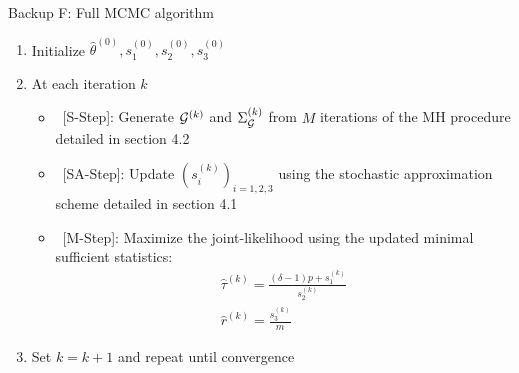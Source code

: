 \begin{frame}{Backup F: Full MCMC algorithm}
    \begin{algorithm}[H]
    \caption{MCMC Algorithm}
    \begin{enumerate}
        \item Initialize $\hat\theta^{(0)}, s_1^{(0)}, s_2^{(0)},s_3^{(0)}$
        \item At each iteration $k$
        \begin{itemize}
            \item \ [S-Step]: Generate $\mathcal{G}^{(k)}$ and $\Sigma_{\mathcal{G}}^{(k)}$ from $M$ iterations of the MH procedure detailed in section 4.2
            \item \ [SA-Step]: Update $(s_i^{(k)})_{i=1,2,3}$ using the stochastic approximation scheme detailed in section 4.1
            \item \ [M-Step]: Maximize the joint-likelihood using the updated minimal sufficient statistics:
            \begin{equation*}
                \begin{gathered}
                    \hat\tau^{(k)} = \frac{(\delta-1)p + s_1^{(k)}}{s_2^{(k)}} \\
                    \hat r^{(k)} = \frac{s_3^{(k)}}{m}
                \end{gathered}
            \end{equation*}
        \end{itemize}
        \item Set $k = k+1$ and repeat until convergence
    \end{enumerate}
\end{algorithm}

\end{frame}


